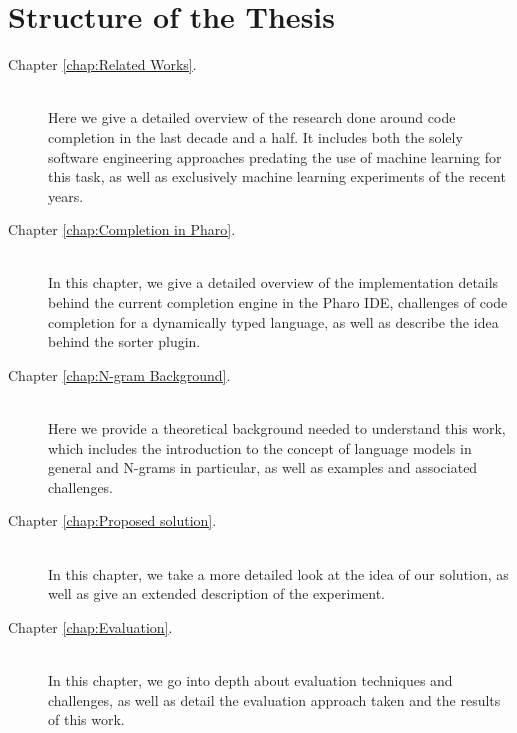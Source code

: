 \section{Structure of the Thesis}
{\hypersetup{linkcolor=black}
\begin{description}
	\item [Chapter \ref{chap:Related Works}. ] \hfill \\
	Here we give a detailed overview of the research done around code completion in the last decade and a half. It includes both the solely software engineering approaches predating the use of machine learning for this task, as well as exclusively machine learning experiments of the recent years.
	\item [Chapter \ref{chap:Completion in Pharo}. ] \hfill \\
	In this chapter, we give a detailed overview of the implementation details behind the current completion engine in the Pharo IDE, challenges of code completion for a dynamically typed language, as well as describe the idea behind the sorter plugin.
	\item [Chapter \ref{chap:N-gram Background}. ] \hfill \\
    Here we provide a theoretical background needed to understand this work, which includes the introduction to the concept of language models in general and N-grams in particular, as well as examples and associated challenges.
    \item [Chapter \ref{chap:Proposed solution}. ] \hfill \\
	In this chapter, we take a more detailed look at the idea of our solution, as well as give an extended description of the experiment.
	\item [Chapter \ref{chap:Evaluation}. ] \hfill \\
	In this chapter, we go into depth about evaluation techniques and challenges, as well as detail the evaluation approach taken and the results of this work.
\end{description}
}